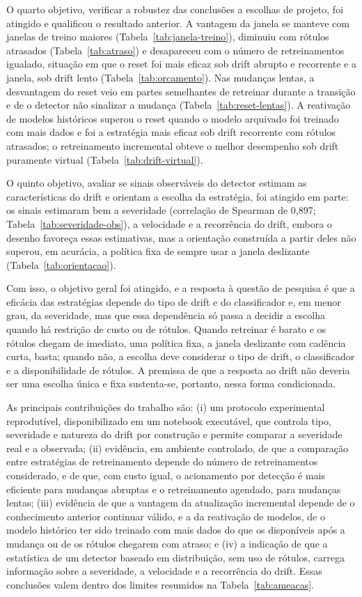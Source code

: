 O quarto objetivo, verificar a robustez das conclusões a escolhas de
projeto, foi atingido e qualificou o resultado anterior. A vantagem da
janela se manteve com janelas de treino maiores
(Tabela~\ref{tab:janela-treino}), diminuiu com rótulos atrasados
(Tabela~\ref{tab:atraso}) e desapareceu com o número de retreinamentos
igualado, situação em que o reset foi mais eficaz sob drift abrupto e
recorrente e a janela, sob drift lento (Tabela~\ref{tab:orcamento}). Nas
mudanças lentas, a desvantagem do reset veio em partes semelhantes de
retreinar durante a transição e de o detector não sinalizar a mudança
(Tabela~\ref{tab:reset-lentas}). A reativação de modelos históricos superou
o reset quando o modelo arquivado foi treinado com mais dados e foi a
estratégia mais eficaz sob drift recorrente com rótulos atrasados; o
retreinamento incremental obteve o melhor desempenho sob drift puramente
virtual (Tabela~\ref{tab:drift-virtual}).

O quinto objetivo, avaliar se sinais observáveis do detector estimam as
características do drift e orientam a escolha da estratégia, foi atingido
em parte: os sinais estimaram bem a severidade (correlação de Spearman de
0,897; Tabela~\ref{tab:severidade-obs}), a velocidade e a recorrência do
drift, embora o desenho favoreça essas estimativas, mas a orientação
construída a partir deles não superou, em acurácia, a política fixa de
sempre usar a janela deslizante (Tabela~\ref{tab:orientacao}).

Com isso, o objetivo geral foi atingido, e a resposta à questão de pesquisa
é que a eficácia das estratégias depende do tipo de drift e do classificador
e, em menor grau, da severidade, mas que essa dependência só passa a decidir
a escolha quando há restrição de custo ou de rótulos. Quando retreinar é
barato e os rótulos chegam de imediato, uma política fixa, a janela
deslizante com cadência curta, basta; quando não, a escolha deve considerar
o tipo de drift, o classificador e a disponibilidade de rótulos. A premissa
de que a resposta ao drift não deveria ser uma escolha única e fixa
sustenta-se, portanto, nessa forma condicionada.

As principais contribuições do trabalho são: (i) um protocolo experimental
reprodutível, disponibilizado em um notebook executável, que controla tipo,
severidade e natureza do drift por construção e permite comparar a
severidade real e a observada; (ii) evidência, em ambiente controlado, de
que a comparação entre estratégias de retreinamento depende do número de
retreinamentos considerado, e de que, com custo igual, o acionamento por
detecção é mais eficiente para mudanças abruptas e o retreinamento agendado,
para mudanças lentas; (iii) evidência de que a vantagem da atualização
incremental depende de o conhecimento anterior continuar válido, e a da
reativação de modelos, de o modelo histórico ter sido treinado com mais dados
do que os disponíveis após a mudança ou de os rótulos chegarem com atraso; e
(iv) a indicação de que a estatística de um detector baseado em
distribuição, sem uso de rótulos, carrega informação sobre a severidade, a
velocidade e a recorrência do drift. Essas conclusões valem dentro dos
limites resumidos na Tabela~\ref{tab:ameacas}.

